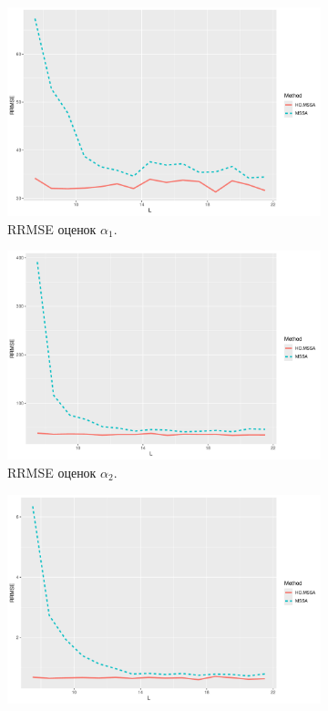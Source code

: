 \documentclass[specialist,
  substylefile=spbu_report.rtx,
subf,href,colorlinks=true, 12pt]{disser}
\theoremstyle{plain}
\theoremstyle{definition}
\theoremstyle{remark}
\begin{document}
\begin{figure}[!ht]
  \centering
  \begin{subfigure}{0.49\linewidth}
    \includegraphics[width=\linewidth, height=0.167\textheight]{rate1_L_large_eq_rates.pdf}
    \caption{RRMSE оценок $\alpha_1$.}
    \label{fig:rate1_L_large_eq_rates}
  \end{subfigure}
  \begin{subfigure}{0.49\linewidth}
    \includegraphics[width=\linewidth, height=0.167\textheight]{rate2_L_large_eq_rates.pdf}
    \caption{RRMSE оценок $\alpha_2$.}
    \label{fig:rate2_L_large_eq_rates}
  \end{subfigure}
  \begin{subfigure}{0.49\linewidth}
    \includegraphics[width=\linewidth, height=0.167\textheight]{freq1_L_large_eq_rates.pdf}

\end{subfigure}
\end{figure}
\end{document}
